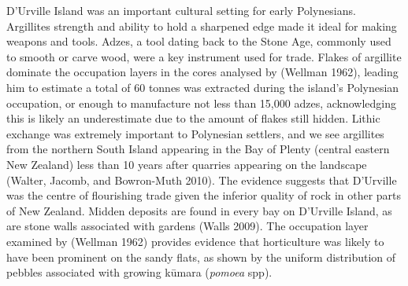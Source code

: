 D'Urville Island was an important cultural setting for early
Polynesians. Argillites strength and ability to hold a sharpened edge
made it ideal for making weapons and tools. Adzes, a tool dating back to
the Stone Age, commonly used to smooth or carve wood, were a key
instrument used for trade. Flakes of argillite dominate the occupation
layers in the cores analysed by (Wellman 1962), leading him to estimate
a total of 60 tonnes was extracted during the island's Polynesian
occupation, or enough to manufacture not less than 15,000 adzes,
acknowledging this is likely an underestimate due to the amount of
flakes still hidden. Lithic exchange was extremely important to
Polynesian settlers, and we see argillites from the northern South
Island appearing in the Bay of Plenty (central eastern New Zealand) less
than 10 years after quarries appearing on the landscape (Walter, Jacomb,
and Bowron-Muth 2010). The evidence suggests that D'Urville was the
centre of flourishing trade given the inferior quality of rock in other
parts of New Zealand. Midden deposits are found in every bay on
D'Urville Island, as are stone walls associated with gardens (Walls
2009). The occupation layer examined by (Wellman 1962) provides evidence
that horticulture was likely to have been prominent on the sandy flats,
as shown by the uniform distribution of pebbles associated with growing
kūmara (\emph{pomoea} spp).

